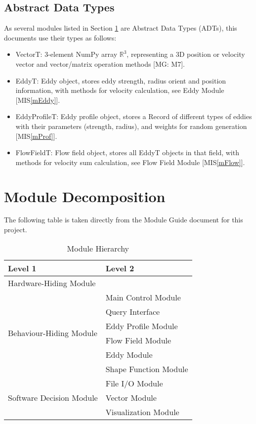 \documentclass[12pt, titlepage]{article}
\begin{document}
\subsection{Abstract Data Types}

As several modules listed in Section \ref{SecMD} are Abstract Data Types (ADTs), this documents use their types as follows:
\begin{itemize}
  \item VectorT: 3-element NumPy array $\mathbb{R}^3$, representing a 3D position or velocity vector and vector/matrix operation methods [MG: M7].
  \item EddyT: Eddy object, stores eddy strength, radius orient and position information, with methods for velocity calculation, see Eddy Module [MIS\ref{mEddy}].
  \item EddyProfileT: Eddy profile object, stores a Record of different types of eddies with their parameters (strength, radius), and weights for random generation [MIS\ref{mProf}].
  \item FlowFieldT: Flow field object, stores all EddyT objects in that field, with methods for velocity sum calculation, see Flow Field Module [MIS\ref{mFlow}].
\end{itemize}

\section{Module Decomposition} \label{SecMD}

The following table is taken directly from the Module Guide document for this project.
\begin{table}[h!]
  \centering
  \begin{tabular}{p{} p{}}
  \toprule
  \textbf{Level 1} & \textbf{Level 2}\\
  \midrule
  
  {Hardware-Hiding Module} & ~ \\
  \midrule
  
  \multirow{6}{0.3\textwidth}{Behaviour-Hiding Module}
  & Main Control Module\\
  & Query Interface\\
  & Eddy Profile Module\\
  & Flow Field Module\\
  & Eddy Module\\
  & Shape Function Module\\
  \midrule
  
  \multirow{3}{0.3\textwidth}{Software Decision Module} 
  & File I/O Module\\
  & Vector Module\\
  & Visualization Module\\
  \bottomrule

\end{tabular}
\caption{Module Hierarchy}
\label{TblMH}
\end{table}
\end{document}
